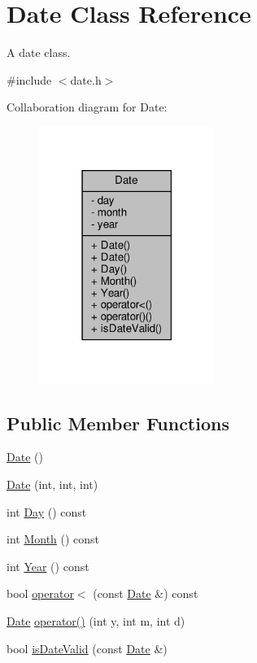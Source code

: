 \hypertarget{class_date}{}\section{Date Class Reference}
\label{class_date}


A date class.  




{\ttfamily \#include $<$date.\+h$>$}



Collaboration diagram for Date\+:\nopagebreak
\begin{figure}[H]
\begin{center}
\leavevmode
\includegraphics[width=162pt]{class_date__coll__graph}
\end{center}
\end{figure}
\subsection*{Public Member Functions}
\begin{DoxyCompactItemize}
\item 
\hyperlink{class_date_a4e59ed4ba66eec61c27460c5d09fa1bd}{Date} ()
\item 
\hyperlink{class_date_af80a5016fde0d599f0a15900193fc663}{Date} (int, int, int)
\item 
int \hyperlink{class_date_ad7f2e4e42aadc85322503dbef8484ad5}{Day} () const
\item 
int \hyperlink{class_date_a1c1871e2d6adcb08fd30ffae440b3803}{Month} () const
\item 
int \hyperlink{class_date_a284f8985596b83ad9388b464eb6b54bd}{Year} () const
\item 
bool \hyperlink{class_date_a08c0538091d061550b90787d9313ca61}{operator$<$} (const \hyperlink{class_date}{Date} \&) const
\item 
\hyperlink{class_date}{Date} \hyperlink{class_date_a425bd02efac05e6b65a8b7456317822f}{operator()} (int y, int m, int d)
\item 
bool \hyperlink{class_date_a2d9a87adab3ae18acdb13e027ad1d0aa}{is\+Date\+Valid} (const \hyperlink{class_date}{Date} \&)
\end{DoxyCompactItemize}
